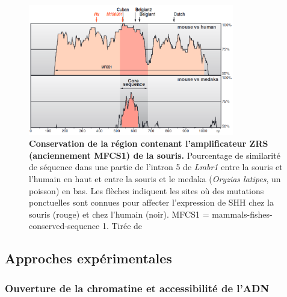 \begin{figure}[h]
 \centering
 \includegraphics[width=0.8\textwidth, page=1] {figures/introduction/fig8.png}
 \caption[Conservation de la région contenant l'\gls{amplificateur} \acrshort{ZRS} (anciennement MFCS1) de la souris.]{
 \textbf{Conservation de la région contenant l'\gls{amplificateur} \acrshort{ZRS} (anciennement MFCS1) de la souris.}
 Pourcentage de similarité de séquence dans une partie de l'intron 5 de \textit{Lmbr1} entre la souris et l'humain en haut et entre la souris et le medaka (\textit{Oryzias latipes}, un poisson) en bas. Les flèches indiquent les sites où des mutations ponctuelles sont connues pour affecter l'expression de \acrshort{SHH} chez la souris (rouge) et chez l'humain (noir).
 MFCS1 = mammals-fishes-conserved-sequence 1.
 Tirée de \citet{sagai_elimination_2005}\\
 }
 \label{fig:Fig8}
\end{figure}

\subsection{Approches expérimentales}
\label{subsec:approch-expe}

\subsubsection{Ouverture de la chromatine et accessibilité de l’ADN}
\label{subsubsec:ouverture-chroma}

